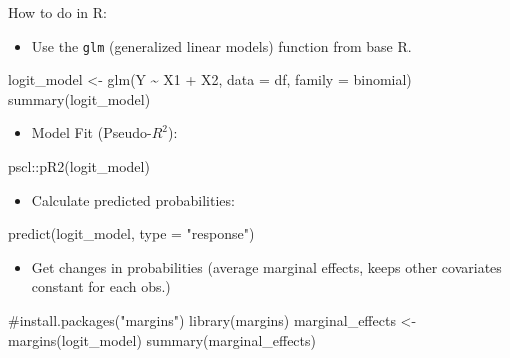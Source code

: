 \documentclass[
  10pt,
  ignorenonframetext,
]{beamer}
\newenvironment{Shaded}{\begin{snugshade}}{\end{snugshade}}
\newcommand{\AttributeTok}[1]{\textcolor[rgb]{0.40,0.45,0.13}{#1}}
\newcommand{\CommentTok}[1]{\textcolor[rgb]{0.37,0.37,0.37}{#1}}
\newcommand{\FunctionTok}[1]{\textcolor[rgb]{0.28,0.35,0.67}{#1}}
\newcommand{\NormalTok}[1]{\textcolor[rgb]{0.00,0.23,0.31}{#1}}
\newcommand{\OtherTok}[1]{\textcolor[rgb]{0.00,0.23,0.31}{#1}}
\newcommand{\SpecialCharTok}[1]{\textcolor[rgb]{0.37,0.37,0.37}{#1}}
\newcommand{\StringTok}[1]{\textcolor[rgb]{0.13,0.47,0.30}{#1}}
\providecommand{\tightlist}{%
  \setlength{\itemsep}{0pt}\setlength{\parskip}{0pt}}\usepackage{longtable,booktabs,array}
\begin{document}
\begin{frame}[fragile]{How to do in R:}
\label{how-to-do-in-r}
\footnotesize

\begin{itemize}
\tightlist
\item
  Use the \texttt{glm} (generalized linear models) function from base R.
\end{itemize}

\begin{Shaded}
\begin{Highlighting}[]
\NormalTok{logit\_model }\OtherTok{\textless{}{-}} \FunctionTok{glm}\NormalTok{(Y }\SpecialCharTok{\textasciitilde{}}\NormalTok{ X1 }\SpecialCharTok{+}\NormalTok{ X2, }\AttributeTok{data =}\NormalTok{ df, }\AttributeTok{family =}\NormalTok{ binomial)}
\FunctionTok{summary}\NormalTok{(logit\_model)}
\end{Highlighting}
\end{Shaded}

\begin{itemize}
\tightlist
\item
  Model Fit (Pseudo-\(R^2\)):
\end{itemize}

\begin{Shaded}
\begin{Highlighting}[]
\NormalTok{pscl}\SpecialCharTok{::}\FunctionTok{pR2}\NormalTok{(logit\_model)}
\end{Highlighting}
\end{Shaded}

\begin{itemize}
\tightlist
\item
  Calculate predicted probabilities:
\end{itemize}

\begin{Shaded}
\begin{Highlighting}[]
\FunctionTok{predict}\NormalTok{(logit\_model, }\AttributeTok{type =} \StringTok{"response"}\NormalTok{)}
\end{Highlighting}
\end{Shaded}

\begin{itemize}
\tightlist
\item
  Get changes in probabilities (average marginal effects, keeps other
  covariates constant for each obs.)
\end{itemize}

\begin{Shaded}
\begin{Highlighting}[]
\CommentTok{\#install.packages("margins")}
\FunctionTok{library}\NormalTok{(margins)}
\NormalTok{marginal\_effects }\OtherTok{\textless{}{-}} \FunctionTok{margins}\NormalTok{(logit\_model)}
\FunctionTok{summary}\NormalTok{(marginal\_effects)}
\end{Highlighting}
\end{Shaded}
\end{frame}
\end{document}
